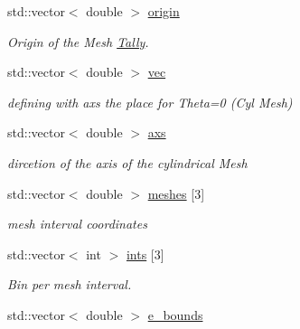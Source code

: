 \begin{DoxyCompactItemize}
std\+::vector$<$ double $>$ \hyperlink{classpyne_1_1_tally_a212b4cbcac800f5812b7698e9827eed3}{origin}
\begin{DoxyCompactList}\small\item\em Origin of the Mesh \hyperlink{classpyne_1_1_tally}{Tally}. \end{DoxyCompactList}\item 
\mbox{\label{classpyne_1_1_tally_af5c2fcb0cec3b5886e4630f5ab6f5dc7}} 
std\+::vector$<$ double $>$ \hyperlink{classpyne_1_1_tally_af5c2fcb0cec3b5886e4630f5ab6f5dc7}{vec}
\begin{DoxyCompactList}\small\item\em defining with axs the place for Theta=0 (Cyl Mesh) \end{DoxyCompactList}\item 
\mbox{\label{classpyne_1_1_tally_a883412bf93615a0cf19f0404b5bf6cba}} 
std\+::vector$<$ double $>$ \hyperlink{classpyne_1_1_tally_a883412bf93615a0cf19f0404b5bf6cba}{axs}
\begin{DoxyCompactList}\small\item\em dircetion of the axis of the cylindrical Mesh \end{DoxyCompactList}\item 
\mbox{\label{classpyne_1_1_tally_a9060e0ccb9e0bd786cd32b217d96647a}} 
std\+::vector$<$ double $>$ \hyperlink{classpyne_1_1_tally_a9060e0ccb9e0bd786cd32b217d96647a}{meshes} \mbox{[}3\mbox{]}
\begin{DoxyCompactList}\small\item\em mesh interval coordinates \end{DoxyCompactList}\item 
\mbox{\label{classpyne_1_1_tally_ac7c55b8fbc45b4399a27953e7981b06c}} 
std\+::vector$<$ int $>$ \hyperlink{classpyne_1_1_tally_ac7c55b8fbc45b4399a27953e7981b06c}{ints} \mbox{[}3\mbox{]}
\begin{DoxyCompactList}\small\item\em Bin per mesh interval. \end{DoxyCompactList}\item 
\mbox{\label{classpyne_1_1_tally_ab5e705bcd3521bc0946ccb026077197c}} 
std\+::vector$<$ double $>$ \hyperlink{classpyne_1_1_tally_ab5e705bcd3521bc0946ccb026077197c}{e\+\_\+bounds}

\end{DoxyCompactItemize}
